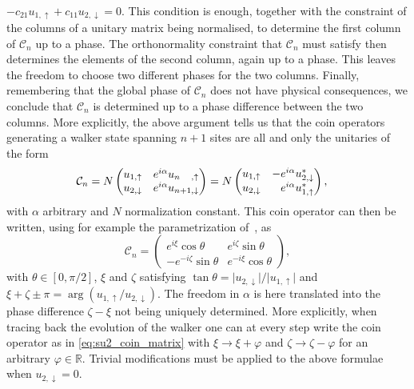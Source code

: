 $
	- c_{21} u_{1, \uparrow} + c_{11} u_{2, \downarrow} = 0.
$
This condition is enough, together with the constraint of the columns of a unitary matrix being normalised, to determine the first column of $\mathcal C_n$ up to a phase.
The orthonormality constraint that $\mathcal C_n$ must satisfy then determines the elements of the second column, again up to a phase.
This leaves the freedom to choose two different phases for the two columns.
Finally, remembering that the global phase of $\mathcal C_n$ does not have physical consequences, we conclude that $\mathcal C_n$ is determined up to a phase difference between the two columns.
More explicitly, the above argument tells us that the coin operators generating a walker state spanning $n+1$ sites are all and only the unitaries of the form
\begin{equation*}
\begin{aligned}
	\mathcal C_n
	&= N \begin{pmatrix}
		u_{1,\uparrow} & e^{i\alpha} u_{\makebox[0pt][l]{$\scriptstyle n$}\phantom{n+1},\uparrow} \\
		u_{2,\downarrow} & e^{i\alpha} u_{n+1,\downarrow}
	\end{pmatrix} = N \begin{pmatrix}
		u_{1,\uparrow} & -e^{i\alpha} u_{2,\downarrow}^* \\
		u_{2,\downarrow} & \phantom{-}e^{i\alpha} u_{1,\uparrow}^*
	\end{pmatrix},
\end{aligned}
\end{equation*}
with $\alpha$ arbitrary and $N$ normalization constant.
This coin operator can then be written, using for example the parametrization of~\cite{chandrashekar2008optimizing}, as
\begin{equation}
	\mathcal C_n = 
	\begin{pmatrix}
		e^{i\xi} \cos\theta &
		e^{i\zeta} \sin\theta \\
		-e^{-i\zeta}\sin\theta & e^{-i\xi}\cos\theta
	\end{pmatrix},
	\label{eq:su2_coin_matrix}
\end{equation}
with $\theta\in [0, \pi/2]$, $\xi$ and $\zeta$ satisfying
$\tan\theta = \lvert u_{2,\downarrow} \rvert/\lvert u_{1,\uparrow} \rvert$
and
$\xi + \zeta \pm \pi = \arg\left(u_{1, \uparrow}/u_{2, \downarrow}\right)$.
The freedom in $\alpha$ is here translated into the phase difference $\zeta - \xi$ not being uniquely determined.
More explicitly, when tracing back the evolution of the walker one can at every step write the coin operator as in \cref{eq:su2_coin_matrix} with $\xi \to \xi + \varphi$ and $\zeta \to \zeta - \varphi$ for an arbitrary $\varphi\in \mathbb R$.
Trivial modifications must be applied to the above formulae when $u_{2,\downarrow} = 0$.

